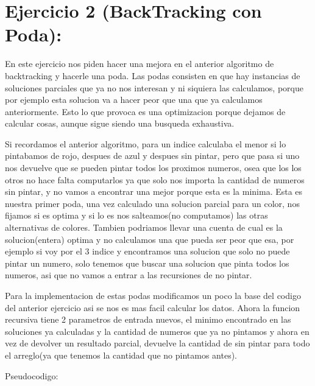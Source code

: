 \section{Ejercicio 2 (BackTracking con Poda):}

En este ejercicio nos piden hacer una mejora en el anterior algoritmo de backtracking y hacerle una poda. Las podas consisten en que hay instancias de soluciones parciales que ya no nos interesan y ni siquiera las calculamos, porque por ejemplo esta solucion va a hacer peor que una que ya calculamos anteriormente. Esto lo que provoca es una optimizacion porque dejamos de calcular cosas, aunque sigue siendo una busqueda exhaustiva.

Si recordamos el anterior algoritmo, para un indice calculaba el menor si lo pintabamos de rojo, despues de azul y despues sin pintar, pero que pasa si uno nos devuelve que se pueden pintar todos los proximos numeros, osea que los los otros no hace falta computarlos ya que solo nos importa la cantidad de numeros sin pintar, y no vamos a encontrar una mejor porque esta es la minima. Esta es nuestra primer poda, una vez calculado una solucion parcial para un color, nos fijamos si es optima y si lo es nos salteamos(no computamos) las otras alternativas de colores.	Tambien podriamos llevar una cuenta de cual es la solucion(entera) optima y no calculamos una que pueda ser peor que esa, por ejemplo si voy por el 3 indice y encontramos una solucion que solo no puede pintar un numero, solo tenemos que buscar una solucion que pinta todos los numeros, asi que no vamos a entrar a las recursiones de no pintar.

Para la implementacion de estas podas modificamos un poco la base del codigo del anterior ejercicio asi se nos es mas facil calcular los datos. Ahora la funcion recursiva tiene 2 parametros de entrada nuevos, el minimo encontrado en las soluciones ya calculadas y la cantidad de numeros que ya no pintamos y ahora en vez de devolver un resultado parcial, devuelve la cantidad de sin pintar para todo el arreglo(ya que tenemos la cantidad que no pintamos antes).

Pseudocodigo:

\begin{algorithm}[H]
\NoCaptionOfAlgo
\end{algorithm}

